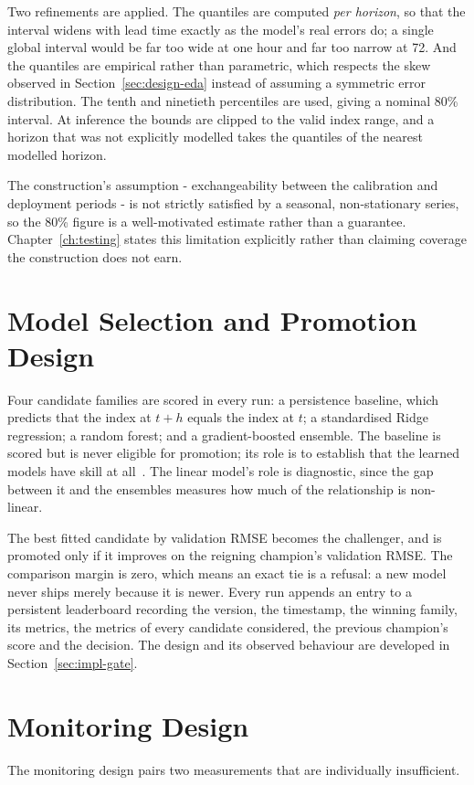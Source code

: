 Two refinements are applied. The quantiles are computed \emph{per horizon}, so
that the interval widens with lead time exactly as the model's real errors do; a
single global interval would be far too wide at one hour and far too narrow at 72.
And the quantiles are empirical rather than parametric, which respects the skew
observed in Section~\ref{sec:design-eda} instead of assuming a symmetric error
distribution. The tenth and ninetieth percentiles are used, giving a nominal 80\%
interval. At inference the bounds are clipped to the valid index range, and a
horizon that was not explicitly modelled takes the quantiles of the nearest
modelled horizon.

The construction's assumption - exchangeability between the calibration and
deployment periods - is not strictly satisfied by a seasonal, non-stationary
series, so the 80\% figure is a well-motivated estimate rather than a guarantee.
Chapter~\ref{ch:testing} states this limitation explicitly rather than claiming
coverage the construction does not earn.

\section{Model Selection and Promotion Design}
\label{sec:design-gate}
Four candidate families are scored in every run: a persistence baseline, which
predicts that the index at $t+h$ equals the index at $t$; a standardised Ridge
regression; a random forest; and a gradient-boosted ensemble. The baseline is
scored but is never eligible for promotion; its role is to establish that the
learned models have skill at all~\cite{ref:fpp}. The linear model's role is
diagnostic, since the gap between it and the ensembles measures how much of the
relationship is non-linear.

The best fitted candidate by validation RMSE becomes the challenger, and is
promoted only if it improves on the reigning champion's validation RMSE. The
comparison margin is zero, which means an exact tie is a refusal: a new model
never ships merely because it is newer. Every run appends an entry to a
persistent leaderboard recording the version, the timestamp, the winning family,
its metrics, the metrics of every candidate considered, the previous champion's
score and the decision. The design and its observed behaviour are developed in
Section~\ref{sec:impl-gate}.

\section{Monitoring Design}
The monitoring design pairs two measurements that are individually insufficient.


